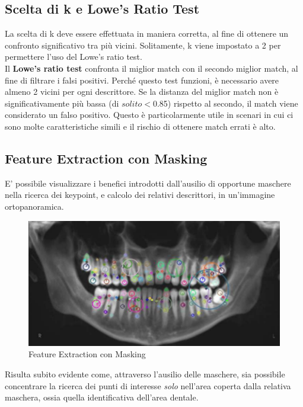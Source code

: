 \documentclass[12pt,a4paper,openright,twoside]{book}
\begin{document}
\subsection{Scelta di k e Lowe's Ratio Test}
La scelta di k deve essere effettuata in maniera corretta, al fine di ottenere un confronto significativo tra più vicini. Solitamente, k viene impostato a 2 per permettere l'uso del Lowe's ratio test.\\
Il \textbf{Lowe's ratio test} confronta il miglior match con il secondo miglior match, al fine di filtrare i falsi positivi. Perché questo test funzioni, è necessario avere almeno 2 vicini per ogni descrittore. Se la distanza del miglior match non è significativamente più bassa (di $solito < $0.85) rispetto al secondo, il match viene considerato un falso positivo. Questo è particolarmente utile in scenari in cui ci sono molte caratteristiche simili e il rischio di ottenere match errati è alto.

\subsection{Feature Extraction con Masking}
E' possibile visualizzare i benefici introdotti dall'ausilio di opportune maschere nella ricerca dei keypoint, e calcolo dei relativi descrittori, in un'immagine ortopanoramica.

\begin{figure}[H]
  	\centering
    	\includegraphics{figures/kpmask.pdf}
    	\caption{Feature Extraction con Masking}
	\label{fig:kpmask}
\end{figure} 

Risulta subito evidente come, attraverso l'ausilio delle maschere, sia possibile concentrare la ricerca dei punti di interesse {\itshape solo} nell'area coperta dalla relativa maschera, ossia quella identificativa dell'area dentale.
\end{document}
